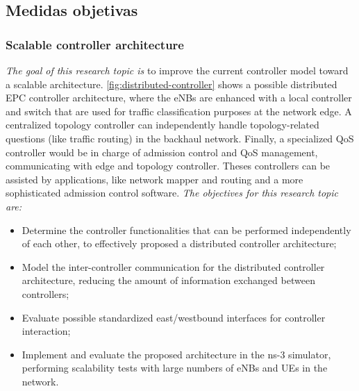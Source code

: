 

\subsection{Medidas objetivas}


\subsubsection{Scalable controller architecture}
\label{subsec:distributed}

\emph{The goal of this research topic is} to improve the current controller
model toward a scalable architecture. \autoref{fig:distributed-controller}
shows a possible distributed \ac{EPC} controller architecture, where the
\acp{eNB} are enhanced with a local controller and switch that are used for
traffic classification purposes at the network edge. A centralized topology
controller can independently handle topology-related questions (like traffic
routing) in the backhaul network. Finally, a specialized \ac{QoS} controller
would be in charge of admission control and \ac{QoS} management, communicating
with edge and topology controller. Theses controllers can be assisted by
applications, like network mapper and routing and a more sophisticated
admission control software. 
\emph{The objectives for this research topic are:}
\begin{itemize}
  \item Determine the controller functionalities that can be performed
  independently of each other, to effectively proposed a distributed controller
  architecture;

  \item Model the inter-controller communication for the distributed controller
  architecture, reducing the amount of information exchanged between
  controllers;

  \item Evaluate possible standardized east/westbound interfaces for controller
  interaction;

  \item Implement and evaluate the proposed architecture in the \ac{ns-3}
  simulator, performing scalability tests with large numbers of \acp{eNB} and
  \acp{UE} in the network.
\end{itemize}

